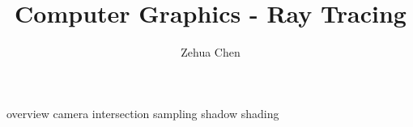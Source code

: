 \documentclass[letterpaper, 11pt]{report}
\title{Computer Graphics - Ray Tracing}
\author{Zehua Chen}
\begin{document}
  \maketitle
  \tableofcontents

  {overview}
  {camera}
  {intersection}
  {sampling}
  {shadow}
  {shading}

  \newpage
  \printglossary
\end{document}
